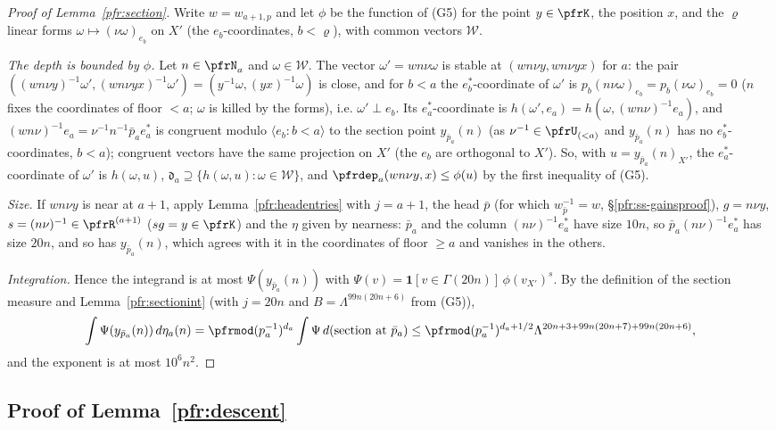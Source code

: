 \documentclass[10pt]{amsart}
\theoremstyle{definition}
\theoremstyle{remark}
\begin{document}
\begin{proof}[Proof of Lemma~\ref{pfr:section}]
Write $w=w_{a+1,p}$ and let $\phi$ be the function of (G5) for the point $y\in\pfrK$, the position $x$, and the
$\varrho$ linear forms $\omega\mapsto(\nu\omega)_{e_b}$ on $X'$ (the $e_b$-coordinates, $b<\varrho$), with common vectors
$\mathcal W$.

\emph{The depth is bounded by $\phi$.} Let $n\in\pfrN_a$ and $\omega\in\mathcal W$. The vector $\omega'=wn\nu\omega$ is stable at
$(wn\nu y,wn\nu yx)$ for $a$: the pair $((wn\nu y)^{-1}\omega',(wn\nu yx)^{-1}\omega')=(y^{-1}\omega,(yx)^{-1}\omega)$ is close,
and for $b<a$ the $e_b^*$-coordinate of $\omega'$ is $p_b(n\nu\omega)_{e_b}=p_b(\nu\omega)_{e_b}=0$ ($n$ fixes the coordinates
of floor $<a$; $\omega$ is killed by the forms), i.e. $\omega'\perp e_b$. Its $e_a^*$-coordinate is $h(\omega',e_a)=
h(\omega,(wn\nu)^{-1}e_a)$, and $(wn\nu)^{-1}e_a=\nu^{-1}n^{-1}\bar p_ae_a^*$ is congruent modulo $\langle e_b:b<a\rangle$ to
the section point $y_{\bar p_a}(n)$ (as $\nu^{-1}\in\pfrU_{(<a)}$ and $y_{\bar p_a}(n)$ has no $e^*_b$-coordinates, $b<a$);
congruent vectors have the same projection on $X'$ (the $e_b$ are orthogonal to $X'$). So, with $u=y_{\bar p_a}(n)_{X'}$,
the $e_a^*$-coordinate of $\omega'$ is $h(\omega,u)$, $\mathfrak d_a\supseteq\{h(\omega,u):\omega\in\mathcal W\}$, and
$\pfrdep_a(wn\nu y,x)\le\phi(u)$ by the first inequality of (G5).

\emph{Size.} If $wn\nu y$ is near at $a+1$, apply Lemma~\ref{pfr:headentries} with $j=a+1$, the head $\bar p$
(for which $w_{\bar p}^{-1}=w$, \S\ref{pfr:ss-gainsproof}), $g=n\nu y$, $s=(n\nu)^{-1}\in\pfrR^{(a+1)}$ ($sg=y\in\pfrK$) and
the $\eta$ given by nearness: $\bar p_a$ and the column $(n\nu)^{-1}e_a^*$ have size $10n$, so
$\bar p_a(n\nu)^{-1}e_a^*$ has size $20n$, and so has $y_{\bar p_a}(n)$, which agrees with it in the coordinates of
floor $\ge a$ and vanishes in the others.

\emph{Integration.} Hence the integrand is at most $\Psi(y_{\bar p_a}(n))$ with $\Psi(v)=\mathbf 1[v\in\Gamma(20n)]\,
\phi(v_{X'})^s$. By the definition of the section measure and Lemma~\ref{pfr:sectionint} (with $j=20n$ and
$B=\Lambda^{99n(20n+6)}$ from (G5)),
\[
\int\Psi(y_{\bar p_a}(n))\,d\eta_a(n)=\pfrmod(p_a^{-1})^{d_a}\int\Psi\,d(\text{section at }\bar p_a)\le\pfrmod(p_a^{-1})^{d_a+1/2}
\Lambda^{20n+3+99n(20n+7)+99n(20n+6)},
\]
and the exponent is at most $10^6n^2$.
\end{proof}

\subsection{Proof of Lemma~\ref{pfr:descent}}\label{pfr:ss-descent}
\end{document}
